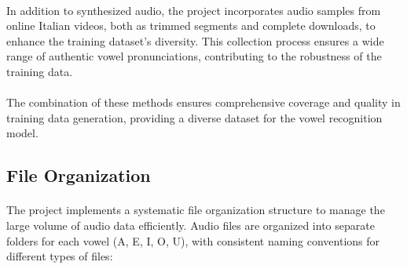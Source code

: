 \paragraph{}
In addition to synthesized audio, the project incorporates audio samples from online Italian videos, both as trimmed segments and complete downloads, to enhance the training dataset's diversity. This collection process ensures a wide range of authentic vowel pronunciations, contributing to the robustness of the training data.

\paragraph{}
The combination of these methods ensures comprehensive coverage and quality in training data generation, providing a diverse dataset for the vowel recognition model.

\subsection{File Organization}
\label{subsec:file-organization}

\paragraph{}
The project implements a systematic file organization structure to manage the large volume of audio data efficiently. Audio files are organized into separate folders for each vowel (A, E, I, O, U), with consistent naming conventions for different types of files:

